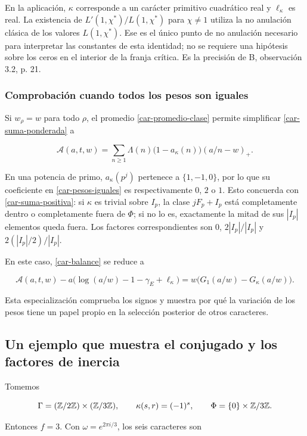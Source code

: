 En la aplicación, $\kappa$ corresponde a un carácter primitivo cuadrático real y $\ell_\kappa$ es real. La existencia de $L'(1,\chi^*)/L(1,\chi^*)$ para $\chi\ne1$ utiliza la no anulación clásica de los valores $L(1,\chi^*)$. Ese es el único punto de no anulación necesario para interpretar las constantes de esta identidad; no se requiere una hipótesis sobre los ceros en el interior de la franja crítica. Es la precisión de B, observación 3.2, p. 21.

\subsubsection*{Comprobación cuando todos los pesos son iguales}

Si $w_\rho=w$ para todo $\rho$, el promedio \eqref{car-promedio-clase} permite simplificar \eqref{car-suma-ponderada} a

\begin{equation}
\mathcal A(a,t,w)
=\sum_{n\ge1}\Lambda(n)
\bigl(1-a_\kappa(n)\bigr)(a/n-w)_+.
\label{car-pesos-iguales}
\end{equation}

En una potencia de primo, $a_\kappa(p^j)$ pertenece a $\{1,-1,0\}$, por lo que su coeficiente en \eqref{car-pesos-iguales} es respectivamente $0$, $2$ o $1$. Esto concuerda con \eqref{car-suma-positiva}: si $\kappa$ es trivial sobre $I_p$, la clase $jF_p+I_p$ está completamente dentro o completamente fuera de $\Phi$; si no lo es, exactamente la mitad de sus $|I_p|$ elementos queda fuera. Los factores correspondientes son $0$, $2|I_p|/|I_p|$ y $2(|I_p|/2)/|I_p|$.

En este caso, \eqref{car-balance} se reduce a

\[
\mathcal A(a,t,w)-
a\bigl(\log(a/w)-1-\gamma_E+\ell_\kappa\bigr)
=w\bigl(G_1(a/w)-G_\kappa(a/w)\bigr).
\]

Esta especialización comprueba los signos y muestra por qué la variación de los pesos tiene un papel propio en la selección posterior de otros caracteres.

\subsection{Un ejemplo que muestra el conjugado y los factores de inercia}

Tomemos

\[
\Gamma=(\mathbb{Z}/2\mathbb{Z})\times(\mathbb{Z}/3\mathbb{Z}),
\qquad \kappa(s,r)=(-1)^s,
\qquad \Phi=\{0\}\times\mathbb{Z}/3\mathbb{Z}.
\]

Entonces $f=3$. Con $\omega=e^{2\pi i/3}$, los seis caracteres son

